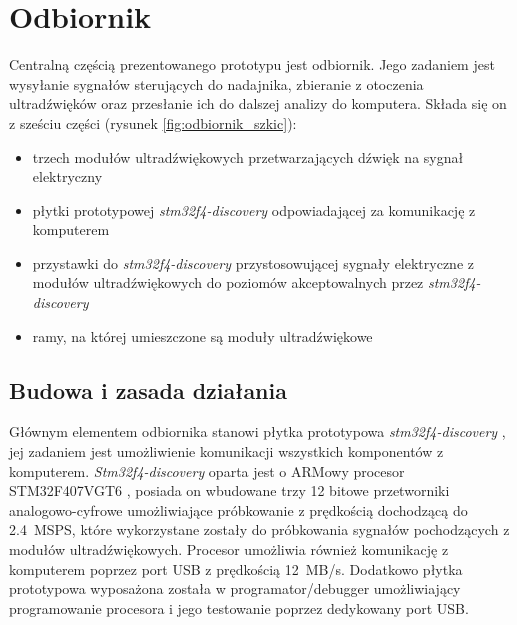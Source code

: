 \chapter{Odbiornik}

Centralną częścią prezentowanego prototypu jest odbiornik.
Jego zadaniem jest wysyłanie sygnałów sterujących do nadajnika, zbieranie z otoczenia ultradźwięków oraz przesłanie
ich do dalszej analizy do komputera.
Składa się on z sześciu części (rysunek \ref{fig:odbiornik_szkic}):

\begin{itemize}
 \item trzech modułów ultradźwiękowych przetwarzających dźwięk na sygnał elektryczny
 \item płytki prototypowej \textit{stm32f4-discovery} \cite{bib:stm32f4Discovery} odpowiadającej za komunikację z komputerem
 \item przystawki do \textit{stm32f4-discovery} przystosowującej sygnały elektryczne z modułów ultradźwiękowych
  do poziomów akceptowalnych przez \textit{stm32f4-discovery}
 \item ramy, na której umieszczone są moduły ultradźwiękowe
\end{itemize}




\section{Budowa i zasada działania}

Głównym elementem odbiornika stanowi płytka prototypowa \textit{stm32f4-discovery} \cite{bib:stm32f4Discovery},
jej zadaniem jest umożliwienie komunikacji wszystkich komponentów z komputerem.
\textit{Stm32f4-discovery} oparta jest o ARMowy procesor STM32F407VGT6 \cite{bib:stm32f407}, posiada on wbudowane trzy 12 bitowe przetworniki
analogowo-cyfrowe umożliwiające próbkowanie z prędkością dochodzącą do \SI{2,4}{MSPS}, które wykorzystane zostały do próbkowania
sygnałów pochodzących z modułów ultradźwiękowych. Procesor umożliwia również komunikację z komputerem poprzez 
port USB z prędkością \SI{12}{MB/s}. Dodatkowo płytka prototypowa wyposażona została w programator/debugger 
umożliwiający programowanie procesora i jego testowanie poprzez dedykowany port USB.

